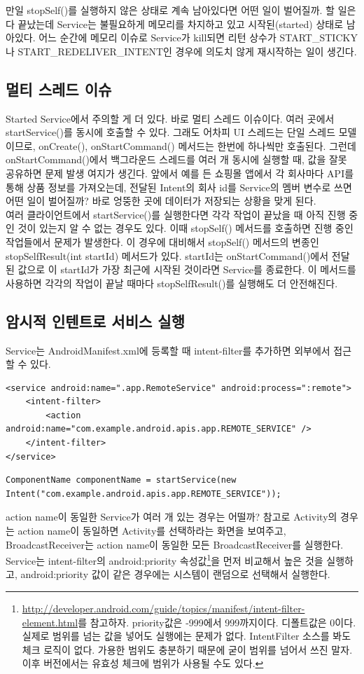 만일 stopSelf()를 실행하지 않은 상태로 계속 남아있다면 어떤 일이 벌어질까. 할 일은 다 끝났는데 Service는 불필요하게 메모리를 차지하고 있고 시작된(started) 상태로 남아있다. 
어느 순간에 메모리 이슈로 Service가 kill되면 리턴 상수가 START\_STICKY나 START\_REDELIVER\_INTENT인 경우에 의도치 않게 재시작하는 일이 생긴다.

\subsection{멀티 스레드 이슈}
Started Service에서 주의할 게 더 있다. 바로 멀티 스레드 이슈이다. 여러 곳에서 startService()를 동시에 호출할 수 있다. 
그래도 어차피 UI 스레드는 단일 스레드 모델이므로, onCreate(), onStartCommand() 메서드는 한번에 하나씩만 호출된다.
그런데 onStartCommand()에서 백그라운드 스레드를 여러 개 동시에 실행할 때, 값을 잘못 공유하면 문제 발생 여지가 생긴다. 앞에서 예를 든 쇼핑몰 앱에서 각 회사마다 API를 통해 상품 정보를 가져오는데, 전달된 Intent의 회사 id를 Service의 멤버 변수로 쓰면 어떤 일이 벌어질까? 바로 엉뚱한 곳에 데이터가 저장되는 상황을 맞게 된다.\\

여러 클라이언트에서 startService()를 실행한다면 각각 작업이 끝났을 때 아직 진행 중인 것이 있는지 알 수 없는 경우도 있다. 이때 stopSelf() 메서드를 호출하면 진행 중인 작업들에서 문제가 발생한다. 
이 경우에 대비해서 stopSelf() 메서드의 변종인 stopSelfResult(int startId) 메서드가 있다.  startId는 onStartCommand()에서 전달된 값으로 이 startId가 가장 최근에 시작된 것이라면 Service를 종료한다. 이 메서드를 사용하면 각각의 작업이 끝날 때마다 stopSelfResult()를 실행해도 더 안전해진다.

\subsection{암시적 인텐트로 서비스 실행}
Service는 AndroidManifest.xml에 등록할 때 intent-filter를 추가하면 외부에서 접근할 수 있다.
\begin{lstlisting}[frame=single]
<service android:name=".app.RemoteService" android:process=":remote">
	<intent-filter>
		<action android:name="com.example.android.apis.app.REMOTE_SERVICE" />
	</intent-filter>
</service>
\end{lstlisting}

\begin{lstlisting}[frame=single]
ComponentName componentName = startService(new Intent("com.example.android.apis.app.REMOTE_SERVICE"));
\end{lstlisting}
action name이 동일한 Service가 여러 개 있는 경우는 어떨까? 참고로 Activity의 경우는 action name이 동일하면 Activity를 선택하라는 화면을 보여주고, BroadcastReceiver는 action name이 동일한 모든 BroadcastReceiver를 실행한다.
Service는 intent-filter의 android:priority 속성값\footnote{\url{http://developer.android.com/guide/topics/manifest/intent-filter-element.html}를 참고하자. priority값은 -999에서 999까지이다. 디폴트값은 0이다. 실제로 범위를 넘는 값을 넣어도 실행에는 문제가 없다. IntentFilter 소스를 봐도 체크 로직이 없다. 가용한 범위도 충분하기 때문에 굳이 범위를 넘어서 쓰진 말자. 이후 버전에서는 유효성 체크에 범위가 사용될 수도 있다.}을 먼저 비교해서 높은 것을 실행하고, android:priority 값이 같은 경우에는 시스템이 랜덤으로 선택해서 실행한다.

